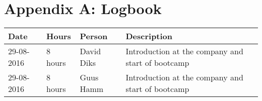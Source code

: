 \section{Appendix A: Logbook}
\begin{tabular}{|l|l|l|l|}
	\hline
	\textbf{Date} & \textbf{Hours} & \textbf{Person} & \textbf{Description} \\
	\hline
	29-08-2016 & 8 hours & David Diks & Introduction at the company and start of bootcamp \\ \hline
	29-08-2016 & 8 hours & Guus Hamm & Introduction at the company and start of bootcamp \\ \hline
\end{tabular}
